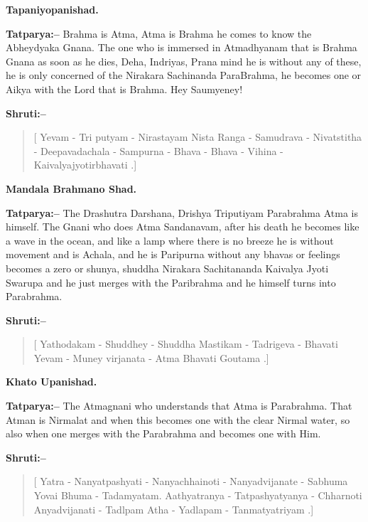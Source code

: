\begin{flushright}
\textbf{Tapaniyopanishad.}
\end{flushright}

\textbf{Tatparya:–} Brahma is Atma, Atma is Brahma he comes to know the Abheydyaka Gnana. The one who is immersed in Atmadhyanam that is Brahma Gnana as soon as he dies, Deha, Indriyas, Prana mind he is without any of these, he is only concerned of the Nirakara Sachinanda ParaBrahma, he becomes one or Aikya with the Lord that is Brahma. Hey Saumyeney!

\textbf{Shruti:–}

\begin{verse}
[ Yevam - Tri putyam - Nirastayam Nista Ranga - Samudrava - Nivatstitha - Deepavadachala - Sampurna - Bhava - Bhava - Vihina - Kaivalyajyotirbhavati .]
\end{verse}

\begin{flushright}
\textbf{Mandala Brahmano Shad.}
\end{flushright}

\textbf{Tatparya:–} The Drashutra Darshana, Drishya Triputiyam Parabrahma Atma is himself. The Gnani who does Atma Sandanavam, after his death he becomes like a wave in the ocean, and like a lamp where there is no breeze he is without movement and is Achala, and he is Paripurna without any bhavas or feelings becomes a zero or shunya, shuddha Nirakara Sachitananda Kaivalya Jyoti Swarupa and he just merges with the Paribrahma and he himself turns into Parabrahma.

\newpage

\textbf{Shruti:–}

\begin{verse}
[ Yathodakam - Shuddhey - Shuddha Mastikam - Tadrigeva - Bhavati  Yevam - Muney virjanata - Atma Bhavati Goutama .]
\end{verse}

\begin{flushright}
\textbf{Khato Upanishad.}
\end{flushright}

\textbf{Tatparya:–} The Atmagnani who understands that Atma is Parabrahma. That Atman is Nirmalat and when this becomes one with the clear Nirmal water, so also when one merges with the Parabrahma and becomes one with Him.

\textbf{Shruti:–}

\begin{verse}
[ Yatra - Nanyatpashyati - Nanyachhainoti - Nanyadvijanate - Sabhuma  Yovai Bhuma - Tadamyatam. Aathyatranya - Tatpashyatyanya - Chharnoti Anyadvijanati - Tadlpam  Atha - Yadlapam - Tanmatyatriyam .]
\end{verse}

